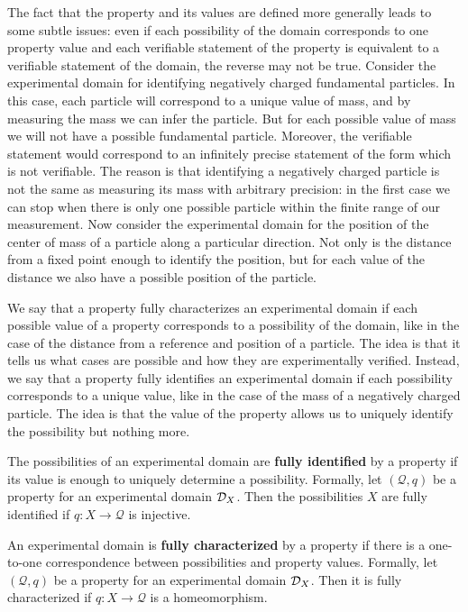 \documentclass[11pt,letterpaper,fleqn]{memoir} %
\begin{document}
The fact that the property and its values are defined more generally leads to some subtle issues: even if each possibility of the domain corresponds to one property value and each verifiable statement of the property is equivalent to a verifiable statement of the domain, the reverse may not be true. Consider the experimental domain for identifying negatively charged fundamental particles. In this case, each particle will correspond to a unique value of mass, and by measuring the mass we can infer the particle. But for each possible value of mass we will not have a possible fundamental particle. Moreover, the verifiable statement  would correspond to an infinitely precise statement of the form  which is not verifiable. The reason is that identifying a negatively charged particle is not the same as measuring its mass with arbitrary precision: in the first case we can stop when there is only one possible particle within the finite range of our measurement. Now consider the experimental domain for the position of the center of mass of a particle along a particular direction. Not only is the distance from a fixed point enough to identify the position, but for each value of the distance we also have a possible position of the particle.

We say that a property fully characterizes an experimental domain if each possible value of a property corresponds to a possibility of the domain, like in the case of the distance from a reference and position of a particle. The idea is that it tells us what cases are possible and how they are experimentally verified. Instead, we say that a property fully identifies an experimental domain if each possibility corresponds to a unique value, like in the case of the mass of a negatively charged particle. The idea is that the value of the property allows us to uniquely identify the possibility but nothing more.

\begin{mathSection}
	\begin{defn}
		The possibilities of an experimental domain are \textbf{fully identified} by a property if its value is enough to uniquely determine a possibility. Formally, let $(\mathcal{Q}, q)$ be a property for an experimental domain $\mathcal{D}_X$. Then the possibilities $X$ are fully identified if $q: X \to \mathcal{Q}$ is injective.
	\end{defn}
	
	\begin{defn}
		An experimental domain is \textbf{fully characterized} by a property if there is a one-to-one correspondence between possibilities and property values. Formally, let $(\mathcal{Q}, q)$ be a property for an experimental domain $\mathcal{D}_X$. Then it is fully characterized if $q: X \to \mathcal{Q}$ is a homeomorphism.
	\end{defn}
\end{mathSection}
\end{document}
